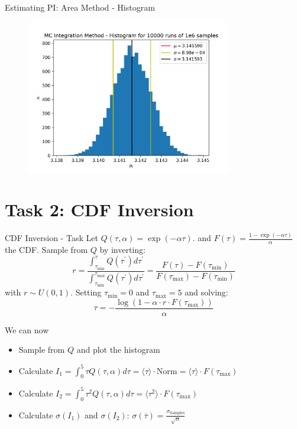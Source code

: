 \documentclass[10pt,xcolor=table, aspectratio=1610]{beamer}
\begin{document}
\begin{frame}[containsverbatim]{Estimating PI: Area Method - Histogram}
  \begin{figure}
    \centering
    \includegraphics[width=0.8\textwidth]{images/mc_integration_method_histogram2.png}
  \end{figure}
\end{frame}

\section{Task 2: CDF Inversion}
\begin{frame}[containsverbatim]{CDF Inversion - Task}
  Let $Q(\tau,\alpha)=\exp(-\alpha\tau)$. and
  $F(\tau) = \frac{1 - \exp(-\alpha \tau)}{\alpha}$ the CDF. Sample from $Q$ by
  inverting:
  \begin{equation*}
    r=\frac{\int_{\tau_{\min }}^\tau Q\left(\tau^{\prime}\right) d \tau^{\prime}}{\int_{\tau_{\min }}^{\tau_{\max }} Q\left(\tau^{\prime}\right) d \tau^{\prime}}=\frac{F(\tau)-F\left(\tau_{\min }\right)}{F\left(\tau_{\max }\right)-F\left(\tau_{\min }\right)}
  \end{equation*}
  with $r\sim U(0,1)$. Setting $\tau_{\min}=0$ and $\tau_{\max}=5$ and solving:
  \begin{equation*}
    \tau = -\frac{\log(1 - \alpha\cdot r\cdot F(\tau_{\max}))}{\alpha}
  \end{equation*}

  We can now
  \begin{itemize}
    \item Sample from $Q$ and plot the histogram
    \item Calculate $I_1=\int_0^5 \tau Q(\tau, \alpha) d \tau=\langle \tau\rangle\cdot \text{Norm}=\langle \tau\rangle\cdot F(\tau_{\max})$
    \item Calculate $I_2=\int_0^5 \tau^2 Q(\tau, \alpha) d \tau=\langle \tau^2\rangle\cdot F(\tau_{\max})$
    \item Calculate $\sigma(I_1)$ and $\sigma(I_2)$: $\sigma(\overline{\tau})=\frac{\sigma_\text{Samples}}{\sqrt{n}}$\cite[p.47]{gubernatis}
  \end{itemize}
\end{frame}
\end{document}
